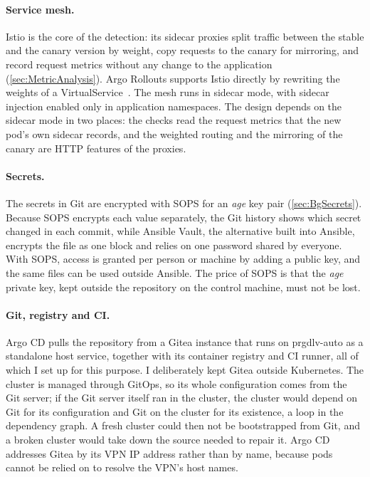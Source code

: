 \paragraph{Service mesh.} Istio is the core of the detection: its sidecar proxies split traffic between the stable and the canary version by weight, copy requests to the canary for mirroring, and record request metrics without any change to the application (\autoref{sec:MetricAnalysis}). Argo Rollouts supports Istio directly by rewriting the weights of a VirtualService~\cite{ArgoRolloutsIstio}. The mesh runs in sidecar mode, with sidecar injection enabled only in application namespaces. The design depends on the sidecar mode in two places: the checks read the request metrics that the new pod's own sidecar records, and the weighted routing and the mirroring of the canary are HTTP features of the proxies.

\paragraph{Secrets.} The secrets in Git are encrypted with SOPS for an \textit{age} key pair (\autoref{sec:BgSecrets}). Because SOPS encrypts each value separately, the Git history shows which secret changed in each commit, while Ansible Vault, the alternative built into Ansible, encrypts the file as one block and relies on one password shared by everyone. With SOPS, access is granted per person or machine by adding a public key, and the same files can be used outside Ansible. The price of SOPS is that the \textit{age} private key, kept outside the repository on the control machine, must not be lost.

\paragraph{Git, registry and CI.} Argo CD pulls the repository from a Gitea instance that runs on prgdlv-auto as a standalone host service, together with its container registry and CI runner, all of which I set up for this purpose. I deliberately kept Gitea outside Kubernetes. The cluster is managed through GitOps, so its whole configuration comes from the Git server; if the Git server itself ran in the cluster, the cluster would depend on Git for its configuration and Git on the cluster for its existence, a loop in the dependency graph. A fresh cluster could then not be bootstrapped from Git, and a broken cluster would take down the source needed to repair it. Argo CD addresses Gitea by its VPN IP address rather than by name, because pods cannot be relied on to resolve the VPN's host names.

